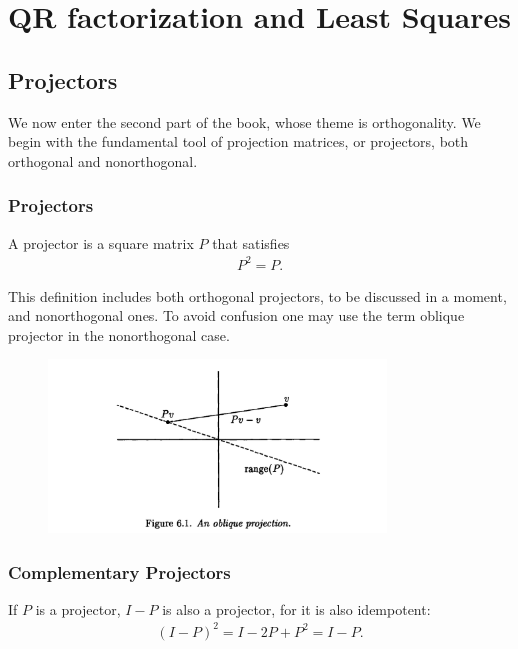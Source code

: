 \part{QR factorization and Least Squares}
\chapter{Projectors}
We now enter the second part of the book, whose theme is orthogonality. We begin with the fundamental tool of projection matrices, or projectors, both orthogonal and nonorthogonal.
\section{Projectors}

\begin{definition}
[Projectors]
\label{def: Projectors}
A projector is a square matrix $P$ that satisfies
\begin{align*}
P^2=P .
\end{align*}
\end{definition}
This definition includes both orthogonal projectors, to be discussed in a moment, and nonorthogonal ones. To avoid confusion one may use the term oblique projector in the nonorthogonal case. 

\begin{figure}[H]
    \centering
    \includegraphics[width=0.8\textwidth]{figures/6-1.png}
\end{figure}

\section{Complementary Projectors} 

\begin{definition}
\label{def: Complementary Projectors}
If $P$ is a projector, $I-P$ is also a projector, for it is also idempotent:
\begin{align*}
(I-P)^2=I-2 P+P^2=I-P .
\end{align*}
\end{definition}

